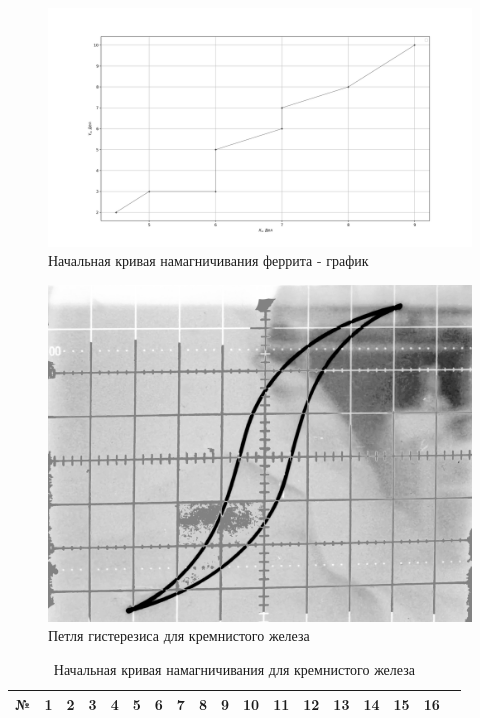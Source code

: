 \documentclass[a4paper]{article}
\begin{document}
\begin{enumerate}
		      \begin{figure}[H]
				\includegraphics[scale=0.5]{graph2.png}
				\caption{Начальная кривая намагничивания феррита - график}
			  \end{figure}

			  \begin{figure}[H]
				  \includegraphics[scale=0.22]{1.png}
				  \caption{Петля гистерезиса для кремнистого железа}
			  \end{figure}

		      \begin{table}[H]
			      \caption{Начальная кривая намагничивания для кремнистого железа}
			      \begin{center}
				      \begin{tabular}{|c|c|c|c|c|c|c|c|c|c|c|c|c|c|c|c|c|c|}
					      \hline
					      №          & 1   & 2   & 3   & 4   & 5   & 6   & 7   & 8   & 9   & 10  & 11  & 12  & 13 & 14 & 15 & 16 \\ 	\hline


\end{tabular}
\end{center}
\end{table}
\end{enumerate}
\end{document}
